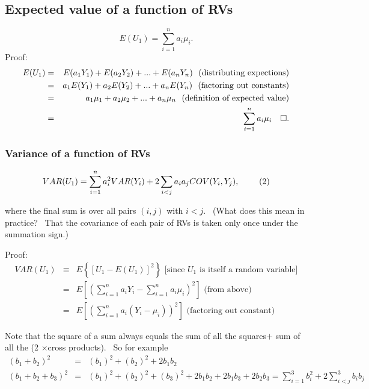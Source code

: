 \documentclass[11pt]{article}
\begin{document}
\subsection{Expected value of a function of RVs\protect\bigskip}

\begin{equation*}
E(U_{1})=\sum_{i=1}^{n}a_{i}\mu _{i}.  \tag{1}
\end{equation*}%
Proof:%
\begin{eqnarray*}
E(U_{1}) &=&E(a_{1}Y_{1})+E(a_{2}Y_{2})+...+E(a_{n}Y_{n})\text{ \
(distributing expections)} \\
&=&a_{1}E(Y_{1})+a_{2}E(Y_{2})+...+a_{n}E(Y_{n})\text{ \ (factoring out
constants)} \\
&=&a_{1}\mu _{1}+a_{2}\mu _{2}+...+a_{n}\mu _{n}\text{ \ (definition of
expected value)} \\
&=&\sum_{i=1}^{n}a_{i}\mu _{i}\text{ \ \ }\square .
\end{eqnarray*}%
\newpage

\subsubsection{Variance of a function of RVs}\protect\bigskip 
\protect\begin{equation*}
VAR(U_{1})=\sum_{i=1}^{n}a_{i}^{2}VAR(Y_{i})+2%
\sum_{i<j}a_{i}a_{j}COV(Y_{i},Y_{j}),\text{ }   \tag{2}
\protect\end{equation*}%


where the final sum is over all pairs $(i,j)$ with $i<j$. \ (What does this
mean in practice? \ That the covariance of each pair of RVs is taken only
once under the summation sign.)\medskip

Proof:%
\begin{eqnarray*}
VAR(U_{1}) &\equiv &E\left\{ [U_{1}-E(U_{1})]^{2}\right\} \text{ \ [since }%
U_{1}\text{ is itself a random variable]} \\
&=&E\left[ \left( \sum_{i=1}^{n}a_{i}Y_{i}-\sum_{i=1}^{n}a_{i}\mu
_{i}\right) ^{2}\right] \text{ \ (from above)} \\
&=&E\left[ \left( \sum_{i=1}^{n}a_{i}\left( Y_{i}-\mu _{i}\right) \right)
^{2}\right] \text{ \ (factoring out constant)}
\end{eqnarray*}

Note that the square of a sum always equals the sum of all the squares$+$
sum of all the (2 $\times $cross products). \ So for example%
\begin{eqnarray*}
\left( b_{1}+b_{2}\right) ^{2} &=&\left( b_{1}\right) ^{2}+\left(
b_{2}\right) ^{2}+2b_{1}b_{2} \\
\left( b_{1}+b_{2}+b_{3}\right) ^{2} &=&\left( b_{1}\right) ^{2}+\left(
b_{2}\right) ^{2}+\left( b_{3}\right)
^{2}+2b_{1}b_{2}+2b_{1}b_{3}+2b_{2}b_{3}=\sum_{i=1}^{3}b_{i}^{2}+2%
\sum_{i<j}^{3}b_{i}b_{j}
\end{eqnarray*}
\end{document}
